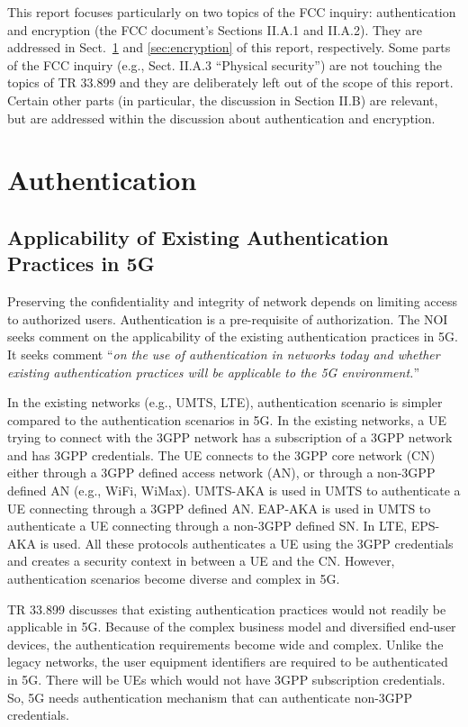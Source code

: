 \documentclass[12pt]{llncs}
\newcommand\ques[1]{``\emph{#1}''}
\begin{document}
This report focuses particularly on two topics of the FCC inquiry: authentication and encryption (the FCC document's Sections II.A.1 and II.A.2). They are addressed in Sect.~\ref{sec:authentication} and \ref{sec:encryption} of this report, respectively. Some parts of the FCC inquiry (e.g., Sect. II.A.3 ``Physical security'') are not touching the topics of TR 33.899 and they are deliberately left out of the scope of this report. Certain other parts (in particular, the discussion in Section II.B) are relevant, but are addressed within the discussion about authentication and encryption.

\section{Authentication}
\label{sec:authentication}
\subsection{Applicability of Existing Authentication Practices in 5G}
Preserving the confidentiality and integrity of network depends on limiting access to authorized users. Authentication is a pre-requisite of authorization. The NOI seeks comment on the applicability of the existing authentication practices in 5G. It seeks comment \ques{on the use of authentication in networks today and whether existing authentication practices will be applicable to the 5G environment.}

In the existing networks (e.g., UMTS, LTE), authentication scenario is simpler compared to the authentication scenarios in 5G. In the existing networks, a UE trying to connect with the 3GPP network has a subscription of a 3GPP network and has 3GPP credentials. The UE connects to the 3GPP core network (CN) either through a 3GPP defined access network (AN), or through a non-3GPP defined AN (e.g., WiFi, WiMax). UMTS-AKA is used in UMTS to authenticate a UE connecting through a 3GPP defined AN. EAP-AKA is used in UMTS to authenticate a UE connecting through a non-3GPP defined SN. In LTE, EPS-AKA is used. All these protocols authenticates a UE using the 3GPP credentials and creates a security context in between a UE and the CN. However, authentication scenarios become diverse and complex in 5G.

TR 33.899 discusses that existing authentication practices would not readily be applicable in 5G. Because of the complex business model and diversified end-user devices, the authentication requirements become wide and complex. Unlike the legacy networks, the user equipment identifiers are required to be authenticated in 5G. There will be UEs which would not have 3GPP subscription credentials. So, 5G needs authentication mechanism that can authenticate non-3GPP credentials. 
\end{document}
